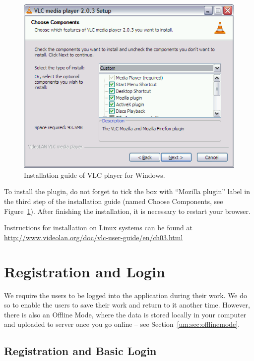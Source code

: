 \begin{figure}[h]
\begin{center}
\includegraphics[scale=0.4]{figures/user_manual/vlc_installation.png}
\end{center}
\caption{Installation guide of VLC player for Windows.}
\label{fig:vlc}
\end{figure}

To install the plugin, do not forget to tick the box with ``Mozilla plugin'' label in the third step of the installation guide (named Choose Components, see Figure~\ref{fig:vlc}). After finishing the installation, it is necessary to restart your browser.

Instructions for installation on Linux systems can be found at \url{http://www.videolan.org/doc/vlc-user-guide/en/ch03.html}


\section{Registration and Login}
\label{um:sec:login}

We require the users to be logged into the application during their work. We do so to enable the users to save their work and return to it another time. However, there is also an Offline Mode, where the data is stored locally in your computer and uploaded to server once you go online -- see Section~\ref{um:sec:offlinemode}.

\subsection{Registration and Basic Login}

